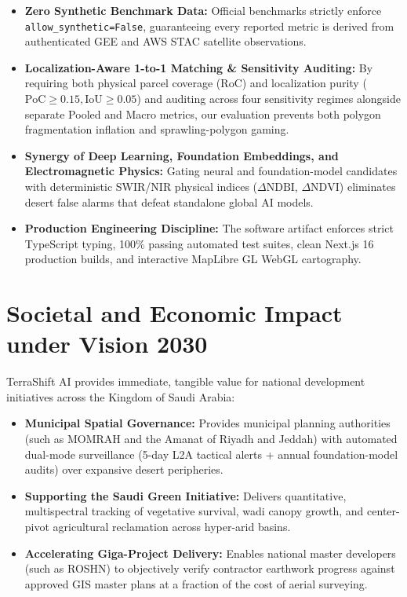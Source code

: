 \begin{itemize}
    \item \textbf{Zero Synthetic Benchmark Data:} Official benchmarks strictly enforce \texttt{allow\_synthetic=False}, guaranteeing every reported metric is derived from authenticated GEE and AWS STAC satellite observations.
    \item \textbf{Localization-Aware 1-to-1 Matching & Sensitivity Auditing:} By requiring both physical parcel coverage ($\text{RoC}$) and localization purity ($\text{PoC} \ge 0.15, \text{IoU} \ge 0.05$) and auditing across four sensitivity regimes alongside separate Pooled and Macro metrics, our evaluation prevents both polygon fragmentation inflation and sprawling-polygon gaming.
    \item \textbf{Synergy of Deep Learning, Foundation Embeddings, and Electromagnetic Physics:} Gating neural and foundation-model candidates with deterministic SWIR/NIR physical indices ($\Delta\text{NDBI}$, $\Delta\text{NDVI}$) eliminates desert false alarms that defeat standalone global AI models.
    \item \textbf{Production Engineering Discipline:} The software artifact enforces strict TypeScript typing, 100\% passing automated test suites, clean Next.js 16 production builds, and interactive MapLibre GL WebGL cartography.
\end{itemize}

\section{Societal and Economic Impact under Vision 2030}
\label{sec:concl_impact}
TerraShift AI provides immediate, tangible value for national development initiatives across the Kingdom of Saudi Arabia:
\begin{itemize}
    \item \textbf{Municipal Spatial Governance:} Provides municipal planning authorities (such as MOMRAH and the Amanat of Riyadh and Jeddah) with automated dual-mode surveillance (5-day L2A tactical alerts + annual foundation-model audits) over expansive desert peripheries.
    \item \textbf{Supporting the Saudi Green Initiative:} Delivers quantitative, multispectral tracking of vegetative survival, wadi canopy growth, and center-pivot agricultural reclamation across hyper-arid basins.
    \item \textbf{Accelerating Giga-Project Delivery:} Enables national master developers (such as ROSHN) to objectively verify contractor earthwork progress against approved GIS master plans at a fraction of the cost of aerial surveying.
\end{itemize}

